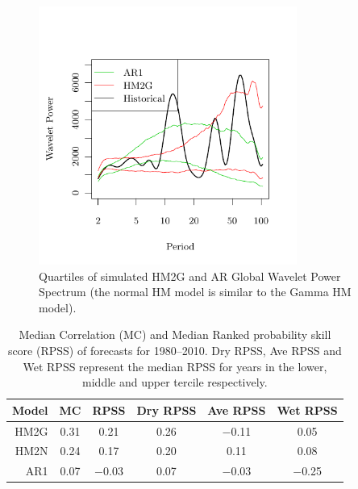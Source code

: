 \documentclass[wrr]{AGUTeX}
\begin{document}
\begin{figure}
\centering
\noindent\includegraphics[width=20pc]{plots/hmm-sim-figure7.pdf}
\caption{Quartiles of simulated HM2G and AR Global Wavelet Power Spectrum (the normal HM model is similar to the Gamma HM model).}\label{fig:spectrum}
\end{figure}

\begin{table}
\centering
\caption{Median Correlation (MC) and Median Ranked probability skill score (RPSS) of forecasts for 1980--2010.  Dry RPSS, Ave RPSS and Wet RPSS represent the median RPSS for years in the lower, middle and upper tercile respectively. }\label{tab:fc-stats}
\begin{tabular}{rccccc}
\toprule
Model & MC & RPSS & Dry RPSS & Ave RPSS & Wet RPSS\\
\midrule
HM2G & 0.31 &     0.21 & 0.26 & $-$0.11 &    0.05\\
HM2N & 0.24 &     0.17 & 0.20 &    0.11 &    0.08\\
AR1  & 0.07 &  $-$0.03 & 0.07 & $-$0.03 & $-$0.25\\
\bottomrule
\end{tabular}
\begin{tablenotes}

\end{tablenotes}
\end{table}
\end{document}

